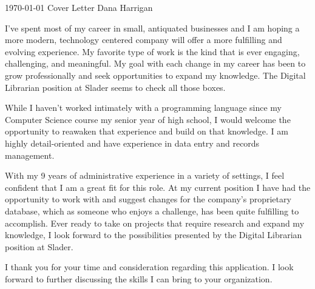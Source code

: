 \documentclass[11pt, a4paper]{awesome-cv}
\begin{document}
\makecvheader[R]

\makecvfooter
  {\today}
  {Cover Letter}
  {Dana Harrigan}

\makelettertitle

\begin{cvletter}

I’ve spent most of my career in small, antiquated businesses and I am hoping a more modern, technology centered company will offer a more fulfilling and evolving experience. My favorite type of work is the kind that is ever engaging, challenging, and meaningful. My goal with each change in my career has been to grow professionally and seek opportunities to expand my knowledge. The Digital Librarian position at Slader seems to check all those boxes.

While I haven’t worked intimately with a programming language since my Computer Science course my senior year of high school, I would welcome the opportunity to reawaken that experience and build on that knowledge. I am highly detail-oriented and have experience in data entry and records management.

With my 9 years of administrative experience in a variety of settings, I feel confident that I am a great fit for this role. At my current position I have had the opportunity to work with and suggest changes for the company’s proprietary database, which as someone who enjoys a challenge, has been quite fulfilling to accomplish. Ever ready to take on projects that require research and expand my knowledge, I look forward to the possibilities presented by the Digital Librarian position at Slader.

I thank you for your time and consideration regarding this application. I look forward to further discussing the skills I can bring to your organization.



\end{cvletter}
\end{document}
